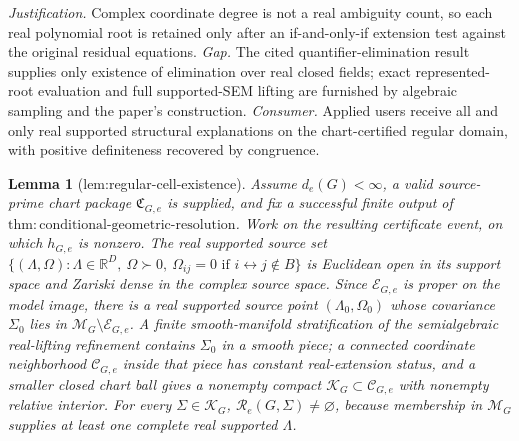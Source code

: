 \documentclass{article}
\newtheorem{lemma}{Lemma}
\begin{document}
\par\smallskip\noindent \textit{Justification.} Complex coordinate degree is not a real ambiguity count, so each real polynomial root is retained only after an if-and-only-if extension test against the original residual equations. \textit{Gap.} The cited quantifier-elimination result supplies only existence of elimination over real closed fields; exact represented-root evaluation and full supported-SEM lifting are furnished by algebraic sampling and the paper's construction. \textit{Consumer.} Applied users receive all and only real supported structural explanations on the chart-certified regular domain, with positive definiteness recovered by congruence.

\begin{lemma}[lem:regular-cell-existence]\label{lem:regular-cell-existence}
Assume \(d_e(G)<\infty\), a valid source-prime chart package \(\mathfrak C_{G,e}\) is supplied, and fix a successful finite output of \(\mathrm{thm:conditional\mbox{-}geometric\mbox{-}resolution}\). Work on the resulting certificate event, on which \(h_{G,e}\) is nonzero. The real supported source set \(\{(\Lambda,\Omega):\Lambda\in\mathbb R^D,\ \Omega\succ0,\ \Omega_{ij}=0\text{ if }i\leftrightarrow j\notin B\}\) is Euclidean open in its support space and Zariski dense in the complex source space. Since \(\mathcal E_{G,e}\) is proper on the model image, there is a real supported source point \((\Lambda_0,\Omega_0)\) whose covariance \(\Sigma_0\) lies in \(\mathcal M_G\setminus\mathcal E_{G,e}\). A finite smooth-manifold stratification of the semialgebraic real-lifting refinement contains \(\Sigma_0\) in a smooth piece; a connected coordinate neighborhood \(\mathcal C_{G,e}\) inside that piece has constant real-extension status, and a smaller closed chart ball gives a nonempty compact \(\mathcal K_G\subset\mathcal C_{G,e}\) with nonempty relative interior. For every \(\Sigma\in\mathcal K_G\), \(\mathcal R_e(G,\Sigma)\ne\varnothing\), because membership in \(\mathcal M_G\) supplies at least one complete real supported \(\Lambda\).
\end{lemma}
\end{document}
